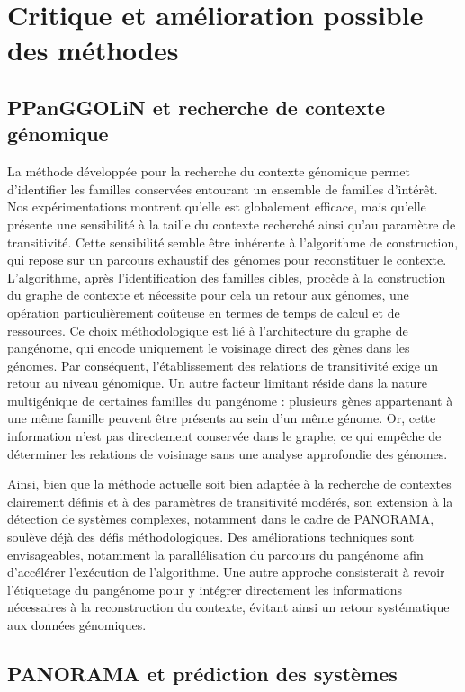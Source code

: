 \section{Critique et amélioration possible des méthodes}

\subsection{PPanGGOLiN et recherche de contexte génomique}

La méthode développée pour la recherche du contexte génomique permet d’identifier les familles conservées entourant un ensemble de familles d’intérêt. Nos expérimentations montrent qu’elle est globalement efficace, mais qu’elle présente une sensibilité à la taille du contexte recherché ainsi qu’au paramètre de transitivité. Cette sensibilité semble être inhérente à l’algorithme de construction, qui repose sur un parcours exhaustif des génomes pour reconstituer le contexte.
L’algorithme, après l’identification des familles cibles, procède à la construction du graphe de contexte et nécessite pour cela un retour aux génomes, une opération particulièrement coûteuse en termes de temps de calcul et de ressources. Ce choix méthodologique est lié à l’architecture du graphe de pangénome, qui encode uniquement le voisinage direct des gènes dans les génomes. Par conséquent, l’établissement des relations de transitivité exige un retour au niveau génomique.
Un autre facteur limitant réside dans la nature multigénique de certaines familles du pangénome : plusieurs gènes appartenant à une même famille peuvent être présents au sein d’un même génome. Or, cette information n’est pas directement conservée dans le graphe, ce qui empêche de déterminer les relations de voisinage sans une analyse approfondie des génomes.

Ainsi, bien que la méthode actuelle soit bien adaptée à la recherche de contextes clairement définis et à des paramètres de transitivité modérés, son extension à la détection de systèmes complexes, notamment dans le cadre de PANORAMA, soulève déjà des défis méthodologiques. Des améliorations techniques sont envisageables, notamment la parallélisation du parcours du pangénome afin d’accélérer l’exécution de l’algorithme. Une autre approche consisterait à revoir l’étiquetage du pangénome pour y intégrer directement les informations nécessaires à la reconstruction du contexte, évitant ainsi un retour systématique aux données génomiques.

\subsection{PANORAMA et prédiction des systèmes}

